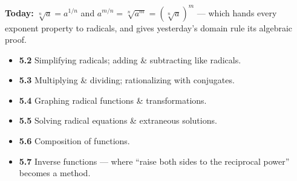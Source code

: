 \documentclass[aspectratio=169, 11pt]{beamer}
\begin{document}
\begin{frame}[t, plain]
  \textbf{Today:} $\sqrt[n]{a}=a^{1/n}$ and $a^{m/n}=\sqrt[n]{a^{m}}=\left(\sqrt[n]{a}\right)^{m}$ ---
  which hands every exponent property to radicals, and gives yesterday's domain rule its algebraic
  proof.\\[8pt]
  \begin{itemize}\setlength{\itemsep}{3pt}
    \item \textbf{5.2} Simplifying radicals; adding \& subtracting like radicals.
    \item \textbf{5.3} Multiplying \& dividing; rationalizing with conjugates.
    \item \textbf{5.4} Graphing radical functions \& transformations.
    \item \textbf{5.5} Solving radical equations \& extraneous solutions.
    \item \textbf{5.6} Composition of functions.
    \item \textbf{5.7} Inverse functions --- where ``raise both sides to the reciprocal power''
          becomes a method.
  \end{itemize}
\end{frame}
\end{document}
